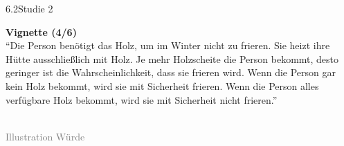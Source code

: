 \documentclass[xcolor=table,9pt,aspectratio=169]{beamer}
\begin{document}
\begin{frame}{\vspace*{10mm}6.2\hspace*{1em}Studie 2}
\begin{multicols}{2}
   \textbf{Vignette (4/6)}\\
   \medskip
   \enquote{Die Person benötigt das Holz, um im Winter nicht zu frieren. Sie heizt ihre Hütte ausschließlich mit Holz. Je mehr Holzscheite die Person bekommt, desto geringer ist die Wahrscheinlichkeit, dass sie frieren wird. Wenn die Person gar kein Holz bekommt, wird sie mit Sicherheit frieren. Wenn die Person alles verfügbare Holz bekommt, wird sie mit Sicherheit nicht frieren.}\\
   \vfill
   \begin{center}
      \\
      \footnotesize{\textcolor{gray}{Illustration Würde}}
   \end{center}
\end{multicols}
\end{frame}
\end{document}
